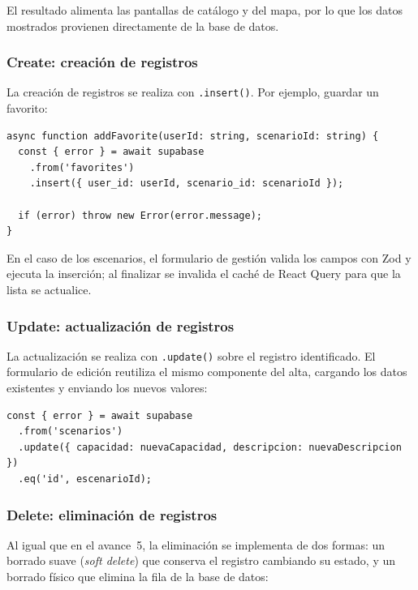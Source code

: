 El resultado alimenta las pantallas de cat\'alogo y del mapa, por lo que
los datos mostrados provienen directamente de la base de datos.

\subsubsection{Create: creaci\'on de registros}

La creaci\'on de registros se realiza con \texttt{.insert()}. Por ejemplo,
guardar un favorito:

\begin{lstlisting}
async function addFavorite(userId: string, scenarioId: string) {
  const { error } = await supabase
    .from('favorites')
    .insert({ user_id: userId, scenario_id: scenarioId });

  if (error) throw new Error(error.message);
}
\end{lstlisting}

En el caso de los escenarios, el formulario de gesti\'on valida los
campos con Zod y ejecuta la inserci\'on; al finalizar se invalida el
cach\'e de React Query para que la lista se actualice.

\subsubsection{Update: actualizaci\'on de registros}

La actualizaci\'on se realiza con \texttt{.update()} sobre el registro
identificado. El formulario de edici\'on reutiliza el mismo componente
del alta, cargando los datos existentes y enviando los nuevos valores:

\begin{lstlisting}
const { error } = await supabase
  .from('scenarios')
  .update({ capacidad: nuevaCapacidad, descripcion: nuevaDescripcion })
  .eq('id', escenarioId);
\end{lstlisting}

\subsubsection{Delete: eliminaci\'on de registros}

Al igual que en el avance~5, la eliminaci\'on se implementa de dos
formas: un borrado suave (\emph{soft delete}) que conserva el registro
cambiando su estado, y un borrado f\'isico que elimina la fila de la
base de datos:

